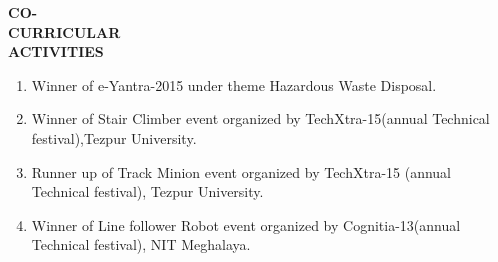 \documentclass{article}
\begin{document}
  \begin{flushleft} 
  	\vspace{0.4in}
  	\textbf{CO- \\CURRICULAR \\ACTIVITIES }
  	\begin{enumerate}
  		\vspace{-0.65in}
  		\addtolength{\itemindent}{1.359in}
  		\item  Winner of e-Yantra-2015 under theme Hazardous Waste Disposal. 
  		\item  Winner of Stair Climber event organized by TechXtra-15(annual Technical\\\hspace{3.4cm} festival),Tezpur University.
  		\item  Runner up of Track Minion event organized by TechXtra-15 (annual \\\hspace{3.4cm}Technical festival), Tezpur University.  
  		\item  Winner of Line follower Robot event organized by Cognitia-13(annual \\\hspace{3.4cm}Technical festival), NIT Meghalaya.
  		
  	\end{enumerate}
  \end{flushleft}
 
\end{document}
